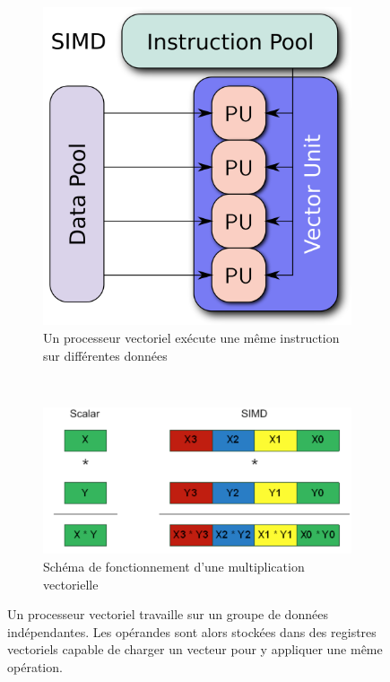 \begin{figure}
    \begin{subfigure}[]{0.5\linewidth}\centering
        \includegraphics[width=.5\linewidth]{images/cpu_simd.png}
        \caption{Un processeur vectoriel exécute une même instruction sur différentes données
        \label{pic_cpu_simd}}
    \end{subfigure}%
    ~ %
    \vspace{2.0cm}
    \begin{subfigure}[]{0.8\linewidth}\centering
        \includegraphics[width=\linewidth]{images/Chapitre1/simd.png}
        \caption{Schéma de fonctionnement d'une multiplication vectorielle\protect\footnotemark}
        \label{pic_simd2}
    \end{subfigure}
   
    \caption{Un processeur vectoriel travaille sur un groupe de données indépendantes. Les opérandes sont alors stockées dans des registres vectoriels capable de charger un vecteur pour y appliquer une même opération.}
    \label{pic_simd}
\end{figure}


